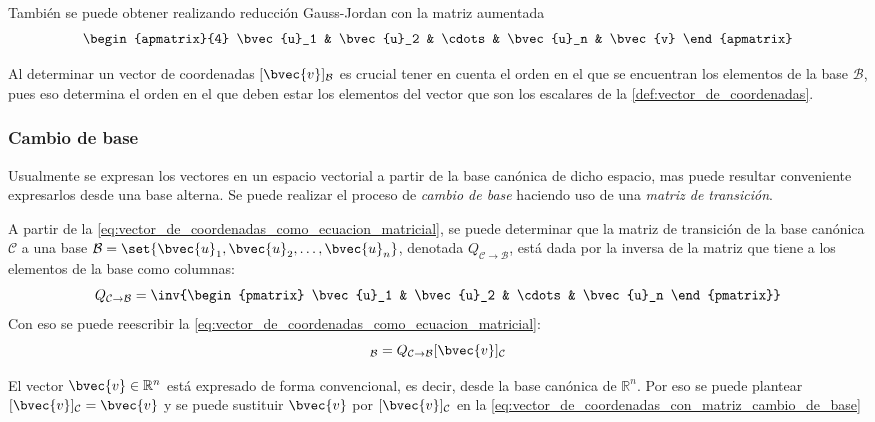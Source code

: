 \documentclass{fmbnotes}
\begin{document}
También se puede obtener realizando reducción Gauss-Jordan con la matriz aumentada 
\[\begin{apmatrix}{4}
\bvec{u}_1 & \bvec{u}_2 & \cdots & \bvec{u}_n & \bvec{v}
\end{apmatrix}\]

\begin{advertencia}
	Al determinar un vector de coordenadas \([\bvec{v}]_\mathcal{B}\) es crucial tener en cuenta el orden en el que se encuentran los elementos de la base \(\mathcal{B}\), pues eso determina el orden en el que deben estar los elementos del vector que son los escalares de la  \autoref{def:vector_de_coordenadas}.
\end{advertencia}

\subsubsection{Cambio de base}\label{sssec:cambio_de_base}

Usualmente se expresan los vectores en un espacio vectorial a partir de la base canónica de dicho espacio, mas puede resultar conveniente expresarlos desde una base alterna. Se puede realizar el proceso de \emph{cambio de base} haciendo uso de una \emph{matriz de transición}.

A partir de la \autoref{eq:vector_de_coordenadas_como_ecuacion_matricial}, se puede determinar que la matriz de transición de la base canónica \(\mathcal{C}\) a una base \(\mathcal{B}=\set{\bvec{u}_1,\bvec{u}_2,\ldots,\bvec{u}_n}\), denotada \(Q_{\mathcal{C}\to \mathcal{B}}\), está dada por la inversa de la matriz que tiene a los elementos de la base como columnas:
\[Q_{\mathcal{C}\to \mathcal{B}}=\inv{\begin{pmatrix}
\bvec{u}_1 & \bvec{u}_2 & \cdots & \bvec{u}_n
\end{pmatrix}}\]
Con eso se puede reescribir la \autoref{eq:vector_de_coordenadas_como_ecuacion_matricial}:
\begin{equation}
[\bvec{v}]_\mathcal{B}=Q_{\mathcal{C}\to \mathcal{B}}[\bvec{v}]_\mathcal{C}
\label{eq:vector_de_coordenadas_con_matriz_cambio_de_base}
\end{equation}

\begin{tip}
El vector \(\bvec{v} \in \mathbb{R}^{n}\) está expresado de forma convencional, es decir, desde la base canónica de \(\mathbb{R}^{n}\). Por eso se puede plantear \([\bvec{v}]_\mathcal{C}=\bvec{v}\) y se puede sustituir \( \bvec{v} \) por \( [\bvec{v}]_\mathcal{C} \) en la \autoref{eq:vector_de_coordenadas_con_matriz_cambio_de_base}
\end{tip}
\end{document}
